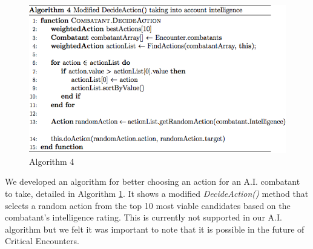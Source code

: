 \documentclass[letterpaper, 10 pt, conference]{ieeeconf}
\begin{document}
\begin{figure}[H]
	\centering
	\centerline{\includegraphics[scale=.37]{algorithm_4}}
	\caption{Algorithm 4}
	\label{fig: Algorithm 4}
\end{figure}

We developed an algorithm for better choosing an action for an A.I. combatant to take, detailed in Algorithm \ref{fig: Algorithm 4}. It shows a modified\textit{ DecideAction()} method that selects a random
action from the top 10 most viable candidates based on the combatant’s intelligence
rating. This is currently not supported in our A.I. algorithm but we felt it was important to note that it is possible in the future of Critical Encounters.
\end{document}
